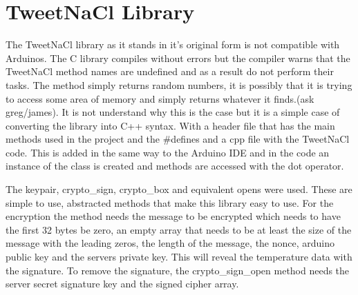 \section{TweetNaCl Library}

The TweetNaCl library as it stands in it's original form is not compatible with Arduinos. The C library compiles without errors but the compiler warns that the TweetNaCl method names are undefined and as a result do not perform their tasks. The method simply returns random numbers, it is possibly that it is trying to access some area of memory and simply returns whatever it finds.(ask greg/james). It is not understand why this is the case but it is a simple case of converting the library into C++ syntax. With a header file that has the main methods used in the project and the \#defines and a cpp file with the TweetNaCl code. This is added in the same way to the Arduino IDE and in the code an instance of the class is created and methods are accessed with the dot operator.

The keypair, crypto\_sign, crypto\_box and equivalent opens were used. These are simple to use, abstracted methods that make this library easy to use. For the encryption the method needs the message to be encrypted which needs to have the first 32 bytes be zero, an empty array that needs to be at least the size of the message with the leading zeros, the length of the message, the nonce, arduino public key and the servers private key. This will reveal the temperature data with the signature. To remove the signature, the crypto\_sign\_open method needs the server secret signature key and the signed cipher array.


